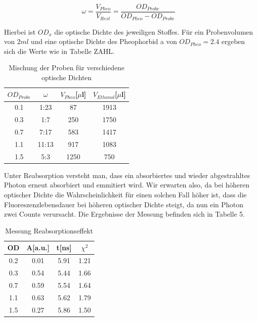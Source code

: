 \documentclass{article}
\begin{document}
\begin{equation}
  \omega = \frac{V_{Pheo}}{V_{Rest}}=\frac{OD_{Probe}}{OD_{Pheo}-OD_{Probe}}
\end{equation}



Hierbei ist $OD_x$ die optische Dichte des jeweiligen Stoffes. Für ein Probenvolumen von $2ml$ und eine
optische Dichte des Pheophorbid a von $OD_{Pheo}=2.4$ ergeben sich die Werte wie in Tabelle ZAHL.

\begin{table}[h]
  \centering
  \begin{tabular}{c|c|c|c}
    $OD_{Probe}$ & $\omega$ & $V_{Pheo}$[$\mu$l] & $V_{Ethanol}$[$\mu$l] \\
    \hline
    0.1          &  1:23  & 87                & 1913 \\
    0.3          &  1:7   & 250               & 1750 \\
    0.7          &  7:17  & 583               & 1417 \\
    1.1          &  11:13 & 917               & 1083 \\
    1.5          &  5:3   & 1250              & 750  \\
  \end{tabular}
  \caption{Mischung der Proben für verschiedene optische Dichten}
\end{table}



Unter Reabsorption versteht man, dass ein absorbiertes und wieder abgestrahltes Photon erneut absorbiert und emmitiert wird.
Wir erwarten also, da bei höheren optischer Dichte die Wahrscheinlichkeit für einen solchen Fall höher ist, dass die Fluoreszenzlebensdauer
bei höheren optischer Dichte steigt, da nun ein Photon zwei Counts verursacht. Die Ergebnisse der Messung befinden sich in Tabelle 5.


\begin{table}[h]
  \centering
  \begin{tabular}{c|c|c|c}
    OD           & A[a.u.]& t[ns]             & $\chi^2$\\
    \hline
    0.2          &  0.01  & 5.91              & 1.21  \\
    0.3          &  0.54  & 5.44              & 1.66  \\
    0.7          &  0.59  & 5.54              & 1.64  \\
    1.1          &  0.63  & 5.62              & 1.79  \\
    1.5          &  0.27  & 5.86              & 1.50   \\
  \end{tabular}
  \caption{Messung Reabsorptionseffekt}
\end{table}
\end{document}

